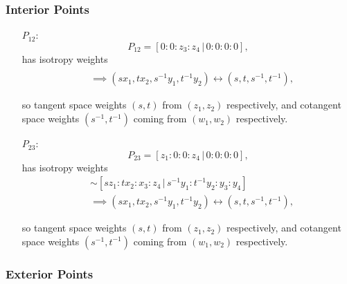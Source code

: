\documentclass{article}
\begin{document}
	\subsubsection{Interior Points}
	
	\begin{itemize}
		\item[$P_{12}$:]
		\[
		P_{12} = [ 0 : 0 : z_{3} : z_{4} \, | \, 0 : 0: 0 : 0 ],
		\]
		has isotropy weights
		\begin{align*}
			[sx_{1} : tx_{2} : z_{3} : z_{4} \, | \, s^{-1}y_{1} : t^{-1}y_{2} : y_{3} : y_{4}] & \\ &\implies (sx_{1}, tx_{2}, s^{-1}y_{1}, t^{-1}y_{2}) \longleftrightarrow (s, t, s^{-1}, t^{-1}),
		\end{align*}
		
		so tangent space weights $(s, t)$ from $(z_{1}, z_{2})$ respectively, and cotangent space weights $(s^{-1}, t^{-1})$ coming from $(w_{1}, w_{2})$ respectively.
		
		\item[$P_{23}$:]
		\[
		P_{23} = [ z_{1} : 0 : 0 : z_{4} \, | \, 0 : 0: 0 : 0 ],
		\]
		has isotropy weights
		\begin{align*}
			[sz_{1} : tx_{2} : x_{3} : z_{4} \, | \, s^{-1}y_{1} : t^{-1}y_{2} : y_{3} : y_{4}] &\sim [sz_{1} : tx_{2} : x_{3} : z_{4} \, | \, s^{-1}y_{1} : t^{-1}y_{2} : y_{3} : y_{4}]  \\ &\implies (sx_{1}, tx_{2}, s^{-1}y_{1}, t^{-1}y_{2}) \longleftrightarrow (s, t, s^{-1}, t^{-1}),
		\end{align*}
		
		so tangent space weights $(s, t)$ from $(z_{1}, z_{2})$ respectively, and cotangent space weights $(s^{-1}, t^{-1})$ coming from $(w_{1}, w_{2})$ respectively.
		
	\end{itemize}
	
	
	\subsubsection{Exterior Points}
	
\end{document}
